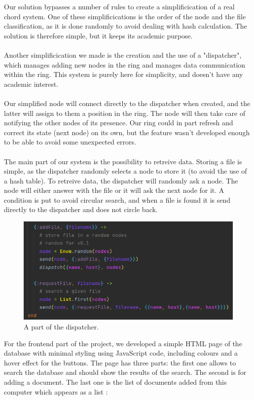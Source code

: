\documentclass{article}
\begin{document}
Our solution bypasses a number of rules to create a simplificication of a real chord system. One of these simplificications is the order of the node and the file classification, as it is done randomly to avoid dealing with hash calculation. The solution is therefore simple, but it keeps its academic purpose.
\\\\
Another simplificication we made is the creation and the use of a "dispatcher", which manages adding new nodes in the ring and manages data communication within the ring. This system is purely here for simplicity, and doesn't have any academic interest.
\\\\
Our simplified node will connect directly to the dispatcher when created, and the latter will assign to them a position in the ring. The node will then take care of notifying the other nodes of its presence. Our ring could in part refresh and correct its state (next node) on its own, but the feature wasn't developed enough to be able to avoid some unexpected errors.
\\\\
The main part of our system is the possibility to retreive data. Storing a file is simple, as the dispatcher randomly selects a node to store it (to avoid the use of a hash table). To retreive data, the dispatcher will randomly ask a node. The node will either answer with the file or it will ask the next node for it. A condition is put to avoid circular search, and when a file is found it is send directly to the dispatcher and does not circle back.

\begin{figure}[!htbp]
  \centering
  \includegraphics[width=\textwidth]{img/dispatch.png}
  \caption{A part of the dispatcher.}
  \label{figure 2 :}
\end{figure}

For the frontend part of the project, we developed a simple HTML page of the database with minimal styling using JavaScript code, including colours and a hover effect for the buttons. 
The page has three parts: the first one allows to search the database and should show the results of the search. The second is for adding a document. The last one is the list of documents added from this computer which appears as a list :
\end{document}
